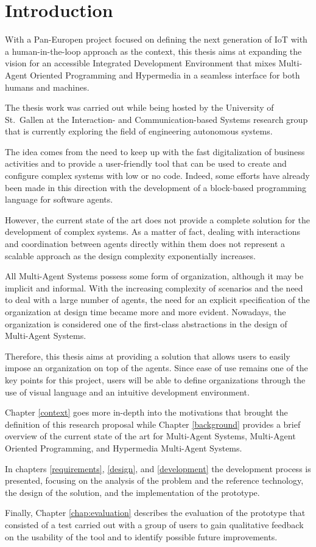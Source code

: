 \chapter{Introduction}

With a Pan-Europen project focused on defining the next generation of IoT with a human-in-the-loop approach as the context, this thesis aims at expanding the vision for an accessible Integrated Development Environment that mixes Multi-Agent Oriented Programming and Hypermedia in a seamless interface for both humans and machines.

The thesis work was carried out while being hosted by the University of St.\ Gallen at the Interaction- and Communication-based Systems research group that is currently exploring the field of engineering autonomous systems.

The idea comes from the need to keep up with the fast digitalization of business activities and to provide a user-friendly tool that can be used to create and configure complex systems with low or no code.
Indeed, some efforts have already been made in this direction with the development of a block-based programming language for software agents.

However, the current state of the art does not provide a complete solution for the development of complex systems.
As a matter of fact, dealing with interactions and coordination between agents directly within them does not represent a scalable approach as the design complexity exponentially increases.

All Multi-Agent Systems possess some form of organization, although it may be implicit and informal.
With the increasing complexity of scenarios and the need to deal with a large number of agents, the need for an explicit specification of the organization at design time became more and more evident.
Nowadays, the organization is considered one of the first-class abstractions in the design of Multi-Agent Systems.

Therefore, this thesis aims at providing a solution that allows users to easily impose an organization on top of the agents.
Since ease of use remains one of the key points for this project, users will be able to define organizations through the use of visual language and an intuitive development environment.

Chapter \ref{context} goes more in-depth into the motivations that brought the definition of this research proposal while Chapter \ref{background} provides a brief overview of the current state of the art for Multi-Agent Systems, Multi-Agent Oriented Programming, and Hypermedia Multi-Agent Systems.

In chapters \ref{requirements}, \ref{design}, and \ref{development} the development process is presented, focusing on the analysis of the problem and the reference technology, the design of the solution, and the implementation of the prototype.

Finally, Chapter \ref{chap:evaluation} describes the evaluation of the prototype that consisted of a test carried out with a group of users to gain qualitative feedback on the usability of the tool and to identify possible future improvements.
